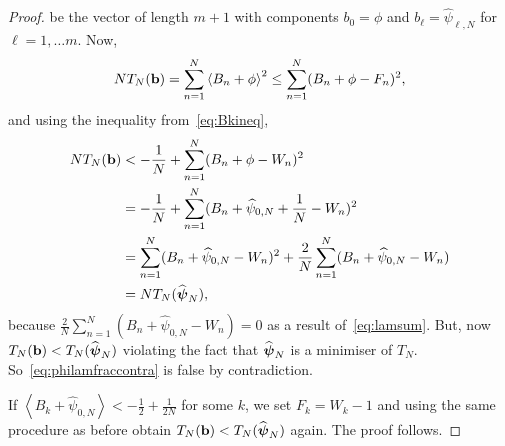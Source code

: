 \documentclass[aap,preprint]{imsart}
\newcommand{\fracpart}[1]{\left\langle #1 \right\rangle}
\begin{document}
\begin{proof}
be the vector of length $m+1$ with components $b_0 = \phi$ and $b_\ell = \widehat{\psi}_{\ell,N}$ for $\ell = 1 , \dots m$.  Now,
\[
N T_N(\bbf) = \sum_{n=1}^N \fracpart{B_n + \phi }^2 \leq  \sum_{n=1}^N (B_n + \phi  - F_n)^2, 
\]
and using the inequality from~\eqref{eq:Bkineq},
\begin{align*}
N T_N(\bbf) &< - \frac{1}{N} + \sum_{n=1}^N (B_n + \phi  - W_n)^2 \\
&= - \frac{1}{N} + \sum_{n=1}^N (B_n + \widehat{\psi}_{0,N} + \frac{1}{N}  - W_n)^2 \\
&= \sum_{n=1}^N (B_n + \widehat{\psi}_{0,N}  - W_n)^2 +  \frac{2}{N}\sum_{n=1}^N (B_n + \widehat{\psi}_{0,N}  - W_n)\\
&= N T_N(\widehat{\psibf}_N),
\end{align*}
because $\frac{2}{N}\sum_{n=1}^N (B_n + \widehat{\psi}_{0,N}  - W_n) = 0$ as a result of~\eqref{eq:lamsum}.  But, now $T_N(\mathbf{b}) < T_N(\widehat{\boldsymbol{\psi}}_N)$ violating the fact that $\widehat{\boldsymbol{\psi}}_N$ is a minimiser of $T_N$.  So~\eqref{eq:philamfraccontra} is false by contradiction.

If $\fracpart{B_k + \widehat{\psi}_{0,N}} < -\frac{1}{2} + \frac{1}{2N}$ for some $k$, we set $F_k = W_k - 1$ and using the same procedure as before obtain $T_N(\mathbf{b}) < T_N(\widehat{\boldsymbol{\psi}}_N)$ again.  The proof follows.
\end{proof}
\end{document}
